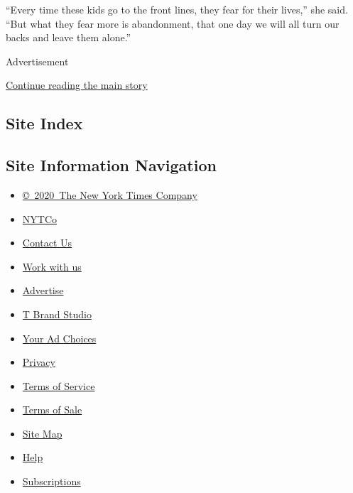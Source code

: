 ``Every time these kids go to the front lines, they fear for their
lives,'' she said. ``But what they fear more is abandonment, that one
day we will all turn our backs and leave them alone.''

Advertisement

\protect\hyperlink{after-bottom}{Continue reading the main story}

\hypertarget{site-index}{%
\subsection{Site Index}\label{site-index}}

\hypertarget{site-information-navigation}{%
\subsection{Site Information
Navigation}\label{site-information-navigation}}

\begin{itemize}
\tightlist
\item
  \href{https://help.nytimes.com/hc/en-us/articles/115014792127-Copyright-notice}{©~2020~The
  New York Times Company}
\end{itemize}

\begin{itemize}
\tightlist
\item
  \href{https://www.nytco.com/}{NYTCo}
\item
  \href{https://help.nytimes.com/hc/en-us/articles/115015385887-Contact-Us}{Contact
  Us}
\item
  \href{https://www.nytco.com/careers/}{Work with us}
\item
  \href{https://nytmediakit.com/}{Advertise}
\item
  \href{http://www.tbrandstudio.com/}{T Brand Studio}
\item
  \href{https://www.nytimes.com/privacy/cookie-policy\#how-do-i-manage-trackers}{Your
  Ad Choices}
\item
  \href{https://www.nytimes.com/privacy}{Privacy}
\item
  \href{https://help.nytimes.com/hc/en-us/articles/115014893428-Terms-of-service}{Terms
  of Service}
\item
  \href{https://help.nytimes.com/hc/en-us/articles/115014893968-Terms-of-sale}{Terms
  of Sale}
\item
  \href{https://spiderbites.nytimes.com}{Site Map}
\item
  \href{https://help.nytimes.com/hc/en-us}{Help}
\item
  \href{https://www.nytimes.com/subscription?campaignId=37WXW}{Subscriptions}
\end{itemize}
